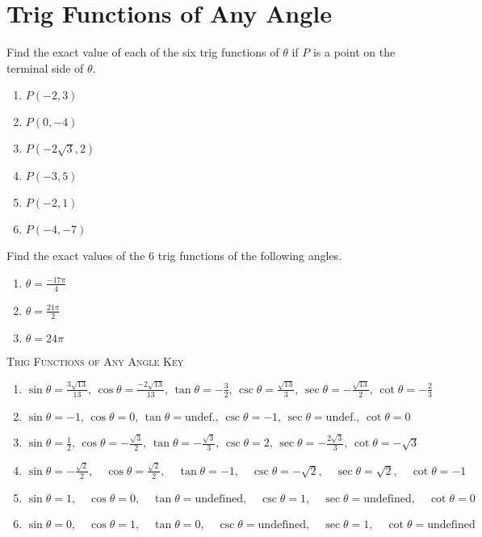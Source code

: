 \chapter{Trig Functions of Any Angle}

Find the exact value of each of the six trig functions of $\theta$ if $P$ is a point on the terminal side of $\theta$.

\begin{enumerate}
	\item $P(-2, 3)$
	\item $P(0,-4)$
	\item $P(-2\sqrt{3}, 2)$
	\item $P(-3, 5)$
	\item $P(-2, 1)$
	\item $P(-4, -7)$
\end{enumerate}	\setcounter{Review}{\value{enumi}}

Find the exact values of the 6 trig functions of the following angles.

\begin{enumerate}		\setcounter{enumi}{\value{Review}}
	\item $\theta = \frac{-17\pi}{4}$
	\item $\theta = \frac{21\pi}{2}$
	\item $\theta = 24\pi$
\end{enumerate}

\newpage

\textsc{Trig Functions of Any Angle Key}

\begin{enumerate}
	\item $\sin\theta = \frac{3\sqrt{13}}{13}, \, \cos\theta = \frac{-2\sqrt{13}}{13}, \, \tan\theta = -\frac{3}{2}, \, \csc\theta = \frac{\sqrt{13}}{3}, \, \sec\theta = -\frac{\sqrt{13}}{2}, \, \cot\theta = -\frac{2}{3}$

    \item $\sin\theta = -1, \, \cos\theta = 0, \, \tan\theta = \text{undef.}, \, \csc\theta = -1, \, \sec\theta = \text{undef.}, \, \cot\theta = 0$
    
    \item $\sin\theta = \frac{1}{2}, \, \cos\theta = -\frac{\sqrt{3}}{2}, \, \tan\theta = -\frac{\sqrt{3}}{3}, \, \csc\theta = 2, \, \sec\theta = -\frac{2\sqrt{3}}{3}, \, \cot\theta = -\sqrt{3}$
    
    \item $\sin\theta = -\frac{\sqrt{2}}{2}, \quad \cos\theta = \frac{\sqrt{2}}{2}, \quad \tan\theta = -1, \quad \csc\theta = -\sqrt{2}, \quad \sec\theta = \sqrt{2}, \quad \cot\theta = -1$
    
    \item $\sin\theta = 1, \quad \cos\theta = 0, \quad \tan\theta = \text{undefined}, \quad \csc\theta = 1, \quad \sec\theta = \text{undefined}, \quad \cot\theta = 0$
    
    \item $\sin\theta = 0, \quad \cos\theta = 1, \quad \tan\theta = 0, \quad \csc\theta = \text{undefined}, \quad \sec\theta = 1, \quad \cot\theta = \text{undefined}$
    
    
\end{enumerate}